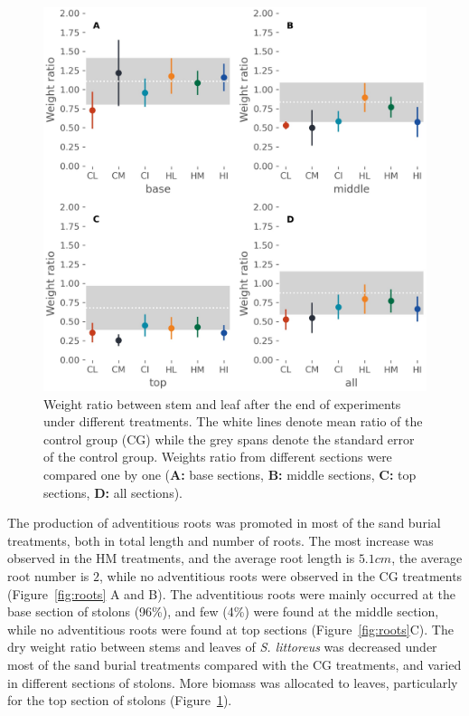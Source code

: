 \documentclass[]{interact}
\theoremstyle{plain}%
\theoremstyle{definition}
\theoremstyle{remark}
\begin{document}
\begin{figure}
  \centering
  \includegraphics[scale=0.8]{../figs/ratio.jpg}
  \caption{
    Weight ratio between stem and leaf after the end of experiments under different treatments. The white lines denote mean ratio of the control group (CG) while the grey spans denote the standard error of the control group. Weights ratio from different sections were compared one by one (\textbf{A:} base sections, \textbf{B:} middle sections, \textbf{C:} top sections, \textbf{D:} all sections).
  }
  \label{fig:ratio}
\end{figure}

The production of adventitious roots was promoted in most of the sand burial treatments, both in total length and number of roots. The most increase was observed in the HM treatments, and the average root length is $5.1cm$, the average root number is $2$, while no adventitious roots were observed in the CG treatments (Figure~\ref{fig:roots} A and B).
The adventitious roots were mainly occurred at the base section of stolons (96\%), and few (4\%) were found at the middle section, while no adventitious roots were found at top sections (Figure~\ref{fig:roots}C).
The dry weight ratio between stems and leaves of \textit{S. littoreus} was decreased under most of the sand burial treatments compared with the CG treatments, and varied in different sections of stolons. More biomass was allocated to leaves, particularly for the top section of stolons (Figure~\ref{fig:ratio}).
\end{document}
